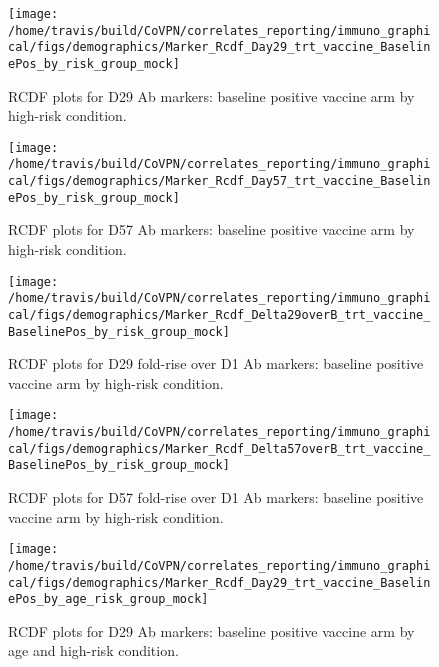 \documentclass[]{book}
\theoremstyle{definition}
\theoremstyle{definition}
\theoremstyle{definition}
\newcommand{\1}{\mathbbm{1}}
\begin{document}
\clearpage
\begin{figure}[H]

{\centering \texttt{[image: /home/travis/build/CoVPN/correlates\_reporting/immuno\_graphical/figs/demographics/Marker\_Rcdf\_Day29\_trt\_vaccine\_BaselinePos\_by\_risk\_group\_mock]} 

}

\caption{RCDF plots for D29 Ab markers: baseline positive vaccine arm by high-risk condition.}\label{fig:unnamed-chunk-96}
\end{figure}

\clearpage
\begin{figure}[H]

{\centering \texttt{[image: /home/travis/build/CoVPN/correlates\_reporting/immuno\_graphical/figs/demographics/Marker\_Rcdf\_Day57\_trt\_vaccine\_BaselinePos\_by\_risk\_group\_mock]} 

}

\caption{RCDF plots for D57 Ab markers: baseline positive vaccine arm by high-risk condition.}\label{fig:unnamed-chunk-97}
\end{figure}

\clearpage
\begin{figure}[H]

{\centering \texttt{[image: /home/travis/build/CoVPN/correlates\_reporting/immuno\_graphical/figs/demographics/Marker\_Rcdf\_Delta29overB\_trt\_vaccine\_BaselinePos\_by\_risk\_group\_mock]} 

}

\caption{RCDF plots for D29 fold-rise over D1 Ab markers: baseline positive vaccine arm by high-risk condition.}\label{fig:unnamed-chunk-98}
\end{figure}

\clearpage
\begin{figure}[H]

{\centering \texttt{[image: /home/travis/build/CoVPN/correlates\_reporting/immuno\_graphical/figs/demographics/Marker\_Rcdf\_Delta57overB\_trt\_vaccine\_BaselinePos\_by\_risk\_group\_mock]} 

}

\caption{RCDF plots for D57 fold-rise over D1 Ab markers: baseline positive vaccine arm by high-risk condition.}\label{fig:unnamed-chunk-99}
\end{figure}

\clearpage
\begin{figure}[H]

{\centering \texttt{[image: /home/travis/build/CoVPN/correlates\_reporting/immuno\_graphical/figs/demographics/Marker\_Rcdf\_Day29\_trt\_vaccine\_BaselinePos\_by\_age\_risk\_group\_mock]} 

}

\caption{RCDF plots for D29 Ab markers: baseline positive vaccine arm by age and high-risk condition.}\label{fig:unnamed-chunk-100}
\end{figure}
\end{document}
